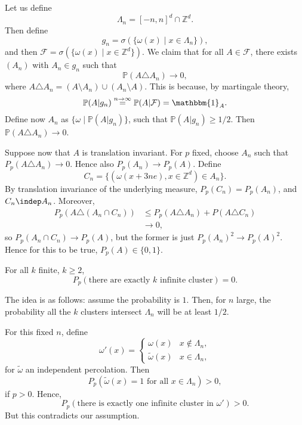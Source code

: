 \documentclass[12pt]{article}
\begin{document}
\begin{proofbox}
	Let us define
	\[
		\Lambda_n = [-n,n]^{d} \cap \mathbb{Z}^{d}.
	\]
	Then define
	\[
		g_n = \sigma(\{\omega(x) \mid x \in \Lambda_n\}),
	\]
	and then $\mathcal{F} = \sigma(\{\omega(x) \mid x \in \mathbb{Z}^{d}\})$. We claim that for all $A \in \mathcal{F}$, there exists $(A_n)$ with $A_n \in g_n$ such that
	\[
	\mathbb{P}(A \triangle A_n) \to 0,
	\]
	where $A \triangle A_n = (A \setminus A_n) \cup (A_n \setminus A)$. This is because, by martingale theory,
	\[
		\mathbb{P}(A | g_n) \overset{n \to \infty}= \mathbb{P}(A| \mathcal{F}) = \mathbbm{1}_{A}.
	\]
	Define now $A_n$ as $\{\omega \mid \mathbb{P}(A | g_n) \}$, such that $\mathbb{P}(A | g_n) \geq 1/2$. Then $\mathbb{P}(A \triangle A_n) \to 0$.
	
	Suppose now that $A$ is translation invariant. For $p$ fixed, choose $A_n$ such that $P_p(A \triangle A_n) \to 0$. Hence also $P_p(A_n) \to P_p(A)$. Define
	\[
		C_n = \{(\omega(x + 3 n e), x \in \mathbb{Z}^{d}) \in A_n\}.
	\]
	By translation invariance of the underlying measure, $P_p(C_n) = P_p(A_n)$, and $C_n \indep A_n$. Moreover,
	\begin{align*}
		P_p(A \triangle (A_n \cap C_n)) &\leq P_p(A \triangle A_n) + P(A \triangle C_n) \\
						&\to 0,
	\end{align*}
	so $P_p(A_n \cap C_n) \to P_p(A)$, but the former is just $P_p(A_n)^2 \to P_p(A)^2$. Hence for this to be true, $P_p(A) \in \{0, 1\}$.
\end{proofbox}

\begin{corollary}
	For all $k$ finite, $k \geq 2$,
	\[
		P_p(\text{there are exactly $k$ infinite cluster}) = 0.
	\]
\end{corollary}


\begin{proofbox}
	The idea is as follows: assume the probability is $1$. Then, for $n$ large, the probability all the $k$ clusters intersect $\Lambda_n$ will be at least $1/2$.
	
	For this fixed $n$, define
	\[
	\omega'(x) =
	\begin{cases}
		\omega(x) & x \not \in \Lambda_{n}, \\
		\tilde \omega(x) & x \in \Lambda_n,
	\end{cases}
	\]
	for $\tilde \omega$ an independent percolation. Then
	\[
		P_p(\tilde \omega(x) = 1 \text{ for all } x \in \Lambda_n) > 0,
	\]
	if $p > 0$. Hence,
	\[
		P_p(\text{there is exactly one infinite cluster in } \omega') > 0.
	\]
	But this contradicts our assumption.
\end{proofbox}
\end{document}
